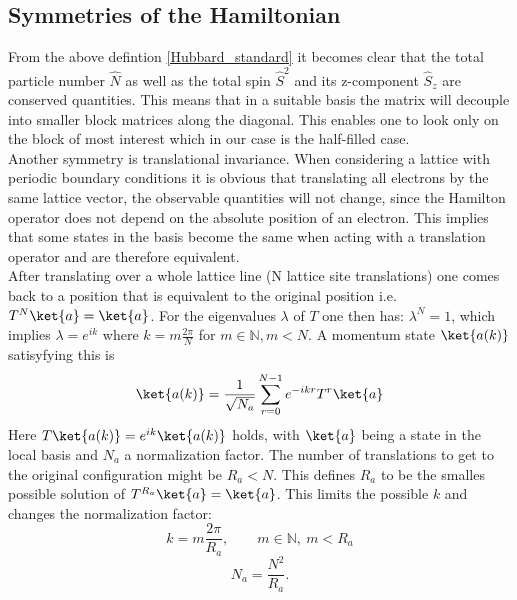 
\subsection{Symmetries of the Hamiltonian}
From the above defintion \eqref{Hubbard_standard} it becomes clear that the total particle number $ \hat{N} $ as well as the total spin $ \hat{S}^2 $ and its z-component $ \hat{S}_z $ are conserved quantities. This means that in a suitable basis the matrix will decouple into smaller block matrices along the diagonal. This enables one to look only on the block of most interest which in our case is the half-filled case. \\


Another symmetry is translational invariance. When considering a lattice with periodic boundary conditions it is obvious that translating all electrons by the same lattice vector, the observable quantities will not change, since the Hamilton operator does not depend on the absolute position of an electron. This implies that some states in the basis become the same when acting with a translation operator and are therefore equivalent.\\
After translating over a whole lattice line  (N lattice site translations) one comes back to a position that is equivalent to the original position i.e. $ T^N\ket{a} = \ket{a} $. For the eigenvalues $\lambda$ of $T$ one then has:  $ \lambda^N = 1 $, which implies $ \lambda = e^{ik} $ where $ k = m\frac{2\pi}{N} $ for $ m \in \mathbb{N}, m < N $. A momentum state $ \ket{a(k)} $ satisyfying this is \begin{equation}\label{momentumstate}
\ket{a(k)} = \frac{1}{\sqrt{N_a}}\sum_{r=0}^{N-1}e^{-ikr}T^r\ket{a}
\end{equation}
Here $ T\ket{a(k)} = e^{ik}\ket{a(k)}$ holds, with $ \ket{a} $ being a state in the local basis and $ N_a $ a normalization factor. The number of translations to get to the original configuration might be $R_a < N$. This defines $R_a$ to be the smalles possible solution of  $ T^{R_a}\ket{a} = \ket{a} $. This limits the possible $k$ and changes the normalization factor:
\begin{equation}\label{k}
k = m\frac{2\pi}{R_a},\qquad m \in \mathbb{N},\: m < R_a
\end{equation}
\begin{equation}\label{N_a}
N_a = \frac{N^2}{R_a}.
\end{equation}



